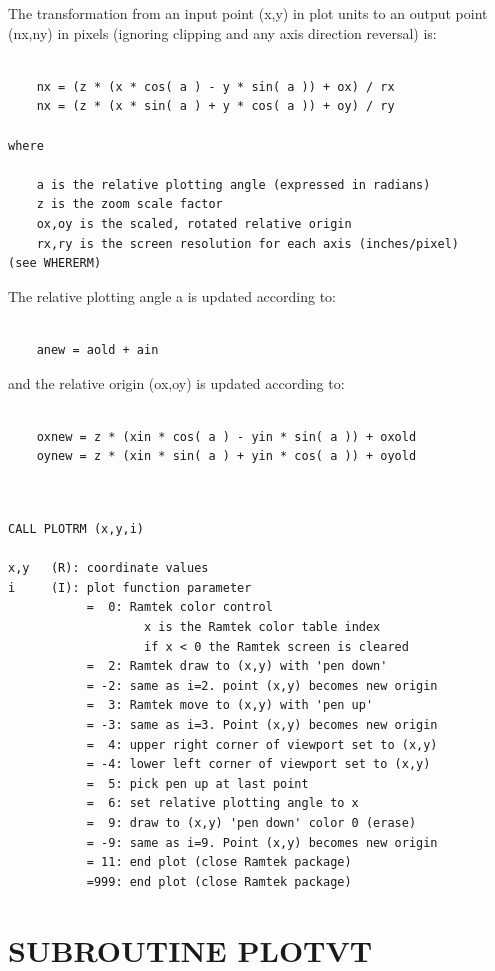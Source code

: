\documentclass[11pt]{report}
\begin{document}
The transformation from an input point (x,y) in plot units to an output point
(nx,ny) in pixels (ignoring clipping and any axis direction reversal) is:
\begin{verbatim}

    nx = (z * (x * cos( a ) - y * sin( a )) + ox) / rx
    nx = (z * (x * sin( a ) + y * cos( a )) + oy) / ry

where

    a is the relative plotting angle (expressed in radians)
    z is the zoom scale factor
    ox,oy is the scaled, rotated relative origin
    rx,ry is the screen resolution for each axis (inches/pixel)
(see WHERERM)
\end{verbatim}
The relative plotting angle a is updated according to:
\begin{verbatim}

    anew = aold + ain

\end{verbatim}
and the relative origin (ox,oy) is updated according to:
\begin{verbatim}

    oxnew = z * (xin * cos( a ) - yin * sin( a )) + oxold
    oynew = z * (xin * sin( a ) + yin * cos( a )) + oyold
	
\end{verbatim}
\begin{verbatim}

CALL PLOTRM (x,y,i)

x,y   (R): coordinate values
i     (I): plot function parameter
           =  0: Ramtek color control
                   x is the Ramtek color table index
                   if x < 0 the Ramtek screen is cleared
           =  2: Ramtek draw to (x,y) with 'pen down'
           = -2: same as i=2. point (x,y) becomes new origin
           =  3: Ramtek move to (x,y) with 'pen up'
           = -3: same as i=3. Point (x,y) becomes new origin
           =  4: upper right corner of viewport set to (x,y)
           = -4: lower left corner of viewport set to (x,y)
           =  5: pick pen up at last point
           =  6: set relative plotting angle to x
           =  9: draw to (x,y) 'pen down' color 0 (erase)
           = -9: same as i=9. Point (x,y) becomes new origin
           = 11: end plot (close Ramtek package)
           =999: end plot (close Ramtek package)
\end{verbatim}

\section{SUBROUTINE PLOTVT}
\end{document}
